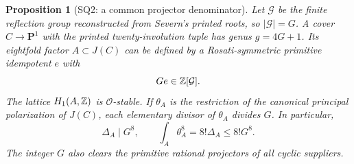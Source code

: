 \documentclass[11pt,a4paper]{article}
\newtheorem{proposition}[theorem]{Proposition}
\theoremstyle{definition}\newtheorem{definition}[theorem]{Definition}
\theoremstyle{remark}\newtheorem{remark}[theorem]{Remark}
\newcommand{\cO}{\mathcal O}\newcommand{\CH}{\operatorname{CH}}\newcommand{\cl}{\operatorname{cl}}
\begin{document}
\begin{proposition}[SQ2: a common projector denominator]\label{SQ2}
Let $\mathcal G$ be the finite reflection group reconstructed from Severn's printed roots, so $|\mathcal G|=G$. A cover $C\to\mathbf P^1$ with the printed twenty-involution tuple has genus $g=4G+1$. Its eightfold factor $A\subset J(C)$ can be defined by a Rosati-symmetric primitive idempotent $e$ with
\[
 Ge\in\mathbb Z[\mathcal G].
\]
The lattice $H_1(A,\mathbb Z)$ is $\cO$-stable. If $\theta_A$ is the restriction of the canonical principal polarization of $J(C)$, each elementary divisor of $\theta_A$ divides $G$. In particular,
\begin{equation}\label{eq:SQ-sourcepolarization}
 \Delta_A\mid G^8,\qquad \int_A\theta_A^8=8!\Delta_A\le8!G^8.
\end{equation}
The integer $G$ also clears the primitive rational projectors of all cyclic suppliers.
\end{proposition}
\end{document}
